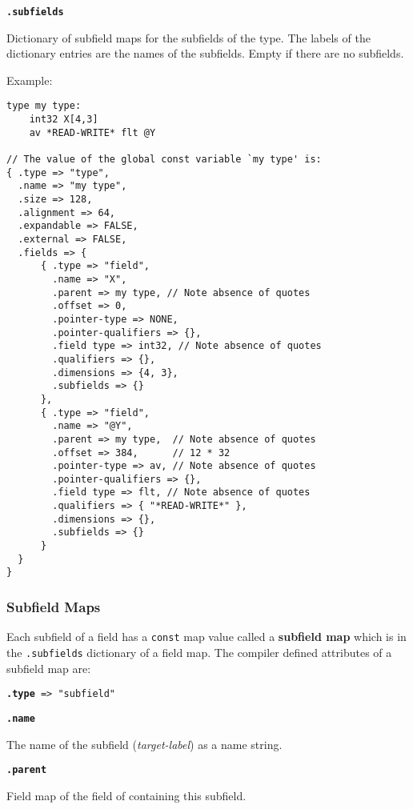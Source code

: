 \documentclass[12pt]{article}
\newcommand{\key}[1]{{\rm \bfseries #1}}
\newcommand{\ttkey}[1]{{\tt \bfseries #1}}
\newenvironment{indpar}[1][0.3in]%
	{\begin{list}{}%
		     {\setlength{\itemsep}{0in}%
		      \setlength{\topsep}{0in}%
		      \setlength{\parsep}{1ex}%
		      \setlength{\labelwidth}{#1}%
		      \setlength{\leftmargin}{#1}%
		      \addtolength{\leftmargin}{\labelsep}}%
	 \item}%
	{\end{list}}
\begin{document}
\ttkey{.subfields}
\begin{indpar}
Dictionary of subfield maps for the subfields of the type.  The labels
of the dictionary entries are the names of the subfields.
Empty if there are no subfields.
\end{indpar}

Example:
\begin{indpar}\begin{verbatim}
type my type:
    int32 X[4,3]
    av *READ-WRITE* flt @Y

// The value of the global const variable `my type' is:
{ .type => "type",
  .name => "my type",
  .size => 128,
  .alignment => 64,
  .expandable => FALSE,
  .external => FALSE,
  .fields => {
      { .type => "field",
        .name => "X",
        .parent => my type, // Note absence of quotes
        .offset => 0,
        .pointer-type => NONE,
        .pointer-qualifiers => {},
        .field type => int32, // Note absence of quotes
        .qualifiers => {},
        .dimensions => {4, 3},
        .subfields => {}
      },
      { .type => "field",
        .name => "@Y",
        .parent => my type,  // Note absence of quotes
        .offset => 384,      // 12 * 32
        .pointer-type => av, // Note absence of quotes
        .pointer-qualifiers => {},
        .field type => flt, // Note absence of quotes
        .qualifiers => { "*READ-WRITE*" },
        .dimensions => {},
        .subfields => {}
      }
  }
}

\end{verbatim}\end{indpar}

\subsubsection{Subfield Maps}
\label{SUBFIELD-MAPS}

Each subfield of a field has a {\tt const} map value called
a \key{subfield map} which is in the {\tt .subfields} dictionary of
a field map.  The compiler defined attributes of a subfield map are:

{\tt \ttkey{.type} => "subfield"}

\ttkey{.name}
\begin{indpar}
The name of the subfield ({\em target-label})
as a name string.
\end{indpar}

\ttkey{.parent}
\begin{indpar}
Field map of the field of containing this subfield.
\end{indpar}
\end{document}
